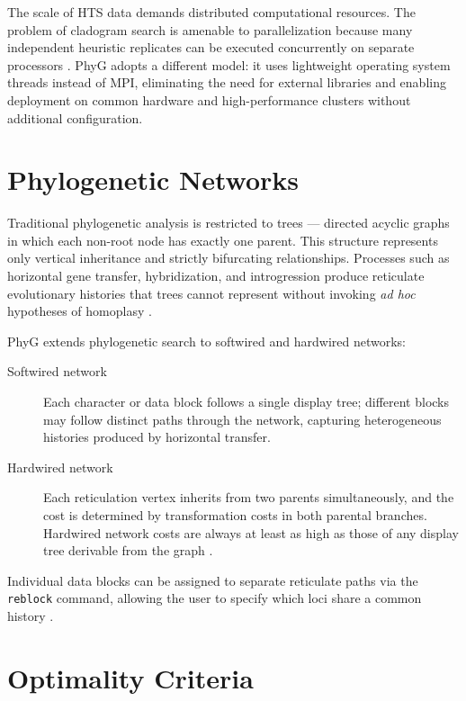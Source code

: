 The scale of HTS data demands distributed computational resources. The problem of cladogram search is amenable to parallelization because many independent heuristic replicates can be executed concurrently on separate processors \parencite{wheeleretal2006}. PhyG \parencite{wheeleretal2024} adopts a different model: it uses lightweight operating system threads instead of MPI, eliminating the need for external libraries and enabling deployment on common hardware and high-performance clusters without additional configuration.

\section{Phylogenetic Networks}
\label{sec:redes}

Traditional phylogenetic analysis is restricted to trees --- directed acyclic graphs in which each non-root node has exactly one parent. This structure represents only vertical inheritance and strictly bifurcating relationships. Processes such as horizontal gene transfer, hybridization, and introgression produce reticulate evolutionary histories that trees cannot represent without invoking \textit{ad hoc} hypotheses of homoplasy \parencite{wheeleretal2024}.

PhyG \parencite{wheeleretal2024} extends phylogenetic search to softwired and hardwired networks:

\begin{description}
    \item[Softwired network] Each character or data block follows a single display tree; different blocks may follow distinct paths through the network, capturing heterogeneous histories produced by horizontal transfer.

    \item[Hardwired network] Each reticulation vertex inherits from two parents simultaneously, and the cost is determined by transformation costs in both parental branches. Hardwired network costs are always at least as high as those of any display tree derivable from the graph \parencite{wheeleretal2024}.
\end{description}

Individual data blocks can be assigned to separate reticulate paths via the \texttt{reblock} command, allowing the user to specify which loci share a common history \parencite{wheeleretal2024}.

\section{Optimality Criteria}
\label{sec:criterios}

